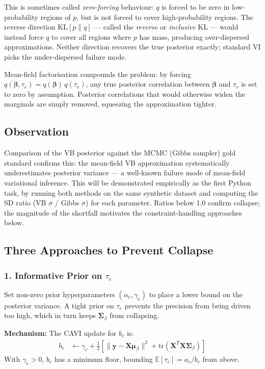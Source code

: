 \documentclass[11pt,a4paper]{article}
\begin{document}
This is sometimes called \emph{zero-forcing} behaviour: $q$ is forced to be zero in low-probability regions of $p$, but is not forced to cover high-probability regions. The reverse direction $\mathrm{KL}[p \| q]$ --- called the \emph{reverse} or \emph{inclusive} KL --- would instead force $q$ to cover all regions where $p$ has mass, producing over-dispersed approximations. Neither direction recovers the true posterior exactly; standard VI picks the under-dispersed failure mode.

Mean-field factorisation compounds the problem: by forcing $q(\bm{\beta}, \tau_e) = q(\bm{\beta})\,q(\tau_e)$, any true posterior correlation between $\bm{\beta}$ and $\tau_e$ is set to zero by assumption. Posterior correlations that would otherwise widen the marginals are simply removed, squeezing the approximation tighter.

\subsection*{Observation}

Comparison of the VB posterior against the MCMC (Gibbs sampler) gold standard confirms this: the mean-field VB approximation systematically underestimates posterior variance --- a well-known failure mode of mean-field variational inference. This will be demonstrated empirically as the first Python task, by running both methods on the same synthetic dataset and computing the SD ratio (VB $\sigma$ / Gibbs $\sigma$) for each parameter. Ratios below 1.0 confirm collapse; the magnitude of the shortfall motivates the constraint-handling approaches below.

\subsection*{Three Approaches to Prevent Collapse}

\subsubsection*{1. Informative Prior on $\tau_e$}

Set non-zero prior hyperparameters $(\alpha_e, \gamma_e)$ to place a lower bound on the posterior variance. A tight prior on $\tau_e$ prevents the precision from being driven too high, which in turn keeps $\bm{\Sigma}_\beta$ from collapsing.

\textbf{Mechanism:} The CAVI update for $b_e$ is:
\begin{align}
  b_e &\leftarrow \gamma_e + \frac{1}{2}\left[\|\bm{y} - \bm{X}\bm{\mu}_\beta\|^2 + \mathrm{tr}(\bm{X}^T\bm{X}\bm{\Sigma}_\beta)\right]
\end{align}
With $\gamma_e > 0$, $b_e$ has a minimum floor, bounding $\mathbb{E}[\tau_e] = a_e/b_e$ from above.
\end{document}
